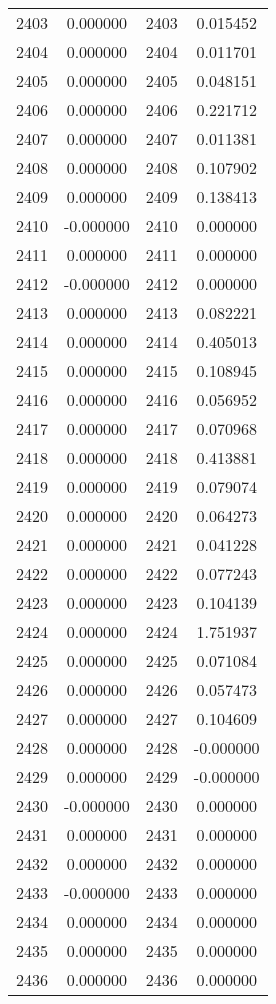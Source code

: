 \documentclass[12pt]{article}
\begin{document}
\begin{longtable}{@{}cccc@{}}
2403 & 0.000000 & 2403 & 0.015452 \\
2404 & 0.000000 & 2404 & 0.011701 \\
2405 & 0.000000 & 2405 & 0.048151 \\
2406 & 0.000000 & 2406 & 0.221712 \\
2407 & 0.000000 & 2407 & 0.011381 \\
2408 & 0.000000 & 2408 & 0.107902 \\
2409 & 0.000000 & 2409 & 0.138413 \\
2410 & -0.000000 & 2410 & 0.000000 \\
2411 & 0.000000 & 2411 & 0.000000 \\
2412 & -0.000000 & 2412 & 0.000000 \\
2413 & 0.000000 & 2413 & 0.082221 \\
2414 & 0.000000 & 2414 & 0.405013 \\
2415 & 0.000000 & 2415 & 0.108945 \\
2416 & 0.000000 & 2416 & 0.056952 \\
2417 & 0.000000 & 2417 & 0.070968 \\
2418 & 0.000000 & 2418 & 0.413881 \\
2419 & 0.000000 & 2419 & 0.079074 \\
2420 & 0.000000 & 2420 & 0.064273 \\
2421 & 0.000000 & 2421 & 0.041228 \\
2422 & 0.000000 & 2422 & 0.077243 \\
2423 & 0.000000 & 2423 & 0.104139 \\
2424 & 0.000000 & 2424 & 1.751937 \\
2425 & 0.000000 & 2425 & 0.071084 \\
2426 & 0.000000 & 2426 & 0.057473 \\
2427 & 0.000000 & 2427 & 0.104609 \\
2428 & 0.000000 & 2428 & -0.000000 \\
2429 & 0.000000 & 2429 & -0.000000 \\
2430 & -0.000000 & 2430 & 0.000000 \\
2431 & 0.000000 & 2431 & 0.000000 \\
2432 & 0.000000 & 2432 & 0.000000 \\
2433 & -0.000000 & 2433 & 0.000000 \\
2434 & 0.000000 & 2434 & 0.000000 \\
2435 & 0.000000 & 2435 & 0.000000 \\
2436 & 0.000000 & 2436 & 0.000000 \\

\end{longtable}
\end{document}
